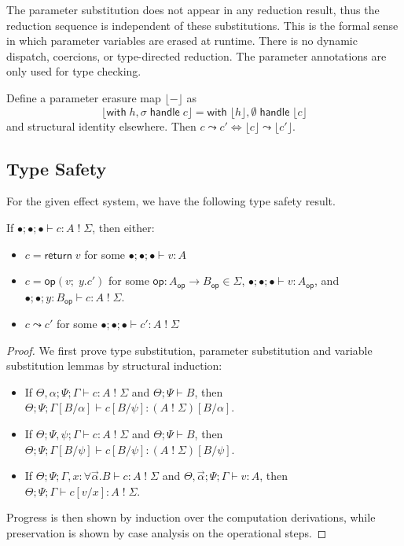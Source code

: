 \documentclass[acmsmall,screen,review,anonymous]{acmart}
\newcommand{\comp}[2]{#1\;!\;#2}
\newcommand{\op}{\mathsf{op}}
\newcommand{\ret}{\mathsf{return}\;}
\newcommand{\with}{\mathsf{with}\;}
\newcommand{\handle}{\;\mathsf{handle}\;}
\newcommand{\Sig}{\Sigma}
\newcommand{\vj}[5]{#1; #2; #3 \vdash #4 : #5}
\newcommand{\cj}[6]{#1; #2; #3 \vdash #4 : \comp{#5}{#6}}
\newcommand{\cjp}[5]{#1; #2; #3 \vdash #4 : #5}
\newcommand{\eenv}{\bullet}
\begin{document}
The parameter substitution does not appear in any reduction result, thus the reduction sequence is independent of these substitutions.
This is the formal sense in which parameter variables are erased at runtime. There is no dynamic dispatch, coercions, or type-directed reduction.
The parameter annotations are only used for type checking.

\begin{proposition}\label{lem:erasure}
  Define a parameter erasure map $\lfloor {-} \rfloor$ as
  \[
    \lfloor \with h, \sigma \handle c \rfloor = \with \lfloor h \rfloor, \emptyset \handle \lfloor c \rfloor
  \]
  and structural identity elsewhere. Then $c \leadsto c' \iff \lfloor c \rfloor \leadsto \lfloor c' \rfloor$.
\end{proposition}

\subsection{Type Safety}

For the given effect system, we have the following type safety result.

\begin{theorem}[Safety]\label{thm:safety}
  If $\cj{\eenv}{\eenv}{\eenv}{c}{A}{\Sig}$, then either:
  \begin{itemize}
    \item $c = \ret v$ for some $\vj{\eenv}{\eenv}{\eenv}{v}{A}$
    \item $c = \op(v;\; y.c')$ for some $\op : A_\op \to B_\op \in \Sig$, $\vj{\eenv}{\eenv}{\eenv}{v}{A_\op}$,
      and $\cj{\eenv}{\eenv}{y:B_\op}{c}{A}{\Sig}$.
    \item $c \leadsto c'$ for some $\cj{\eenv}{\eenv}{\eenv}{c'}{A}{\Sig}$
  \end{itemize}
\end{theorem}

\begin{proof}
  We first prove type substitution, parameter substitution and variable substitution lemmas by structural induction:
  \begin{itemize}
    \item If $\cj{\Theta,\alpha}{\Psi}{\Gamma}{c}{A}{\Sig}$ and $\Theta;\Psi \vdash B$, then $\cjp{\Theta}{\Psi}{\Gamma[B / \alpha]}{c[B/ \psi]}{(\comp{A}{\Sig})[B/ \alpha]}$.
    \item If $\cj{\Theta}{\Psi,\psi}{\Gamma}{c}{A}{\Sig}$ and $\Theta;\Psi \vdash B$, then $\cjp{\Theta}{\Psi}{\Gamma[B / \psi]}{c[B/ \psi]}{(\comp{A}{\Sig})[B/ \psi]}$.
    \item If $\cj{\Theta}{\Psi}{\Gamma, x:\forall \vec{\alpha}.B}{c}{A}{\Sig}$ and $\vj{\Theta,\vec{\alpha}}{\Psi}{\Gamma}{v}{A}$, then $\cjp{\Theta}{\Psi}{\Gamma}{c[v / x]}{\comp{A}{\Sig}}$.
  \end{itemize}
  Progress is then shown by induction over the computation derivations, while preservation is shown by case analysis on the operational steps.
\end{proof}
\end{document}
